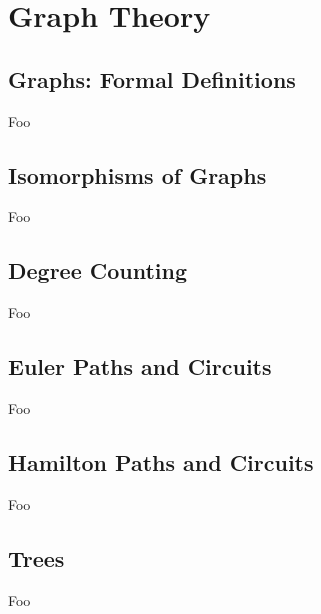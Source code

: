 \section{Graph Theory}

\subsection{Graphs: Formal Definitions}

Foo

\subsection{Isomorphisms of Graphs}

Foo

\subsection{Degree Counting}

Foo

\subsection{Euler Paths and Circuits}

Foo

\subsection{Hamilton Paths and Circuits}

Foo

\subsection{Trees}

Foo


